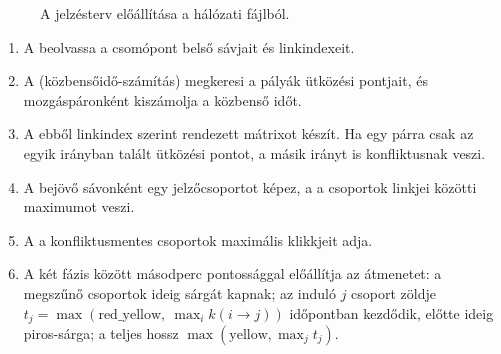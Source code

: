 \documentclass[11pt,a4paper]{article}
\begin{document}
\begin{figure}[h]
\centering
{}
\caption{A jelzésterv előállítása a hálózati fájlból.}
\label{fig:jelzesterv}
\end{figure}

\begin{enumerate}
  \item A  beolvassa a csomópont belső sávjait és linkindexeit.
  \item A  (közbensőidő-számítás) megkeresi a pályák ütközési pontjait,
        és mozgáspáronként kiszámolja a közbenső időt.
  \item A  ebből linkindex szerint rendezett mátrixot készít. Ha egy
        párra csak az egyik irányban talált ütközési pontot, a másik irányt is konfliktusnak veszi.
  \item A  bejövő sávonként egy jelzőcsoportot képez, a
         a csoportok linkjei közötti maximumot veszi.
  \item A  a konfliktusmentes csoportok maximális klikkjeit adja.
  \item A  két fázis között másodperc pontossággal előállítja az
        átmenetet: a megszűnő csoportok  ideig sárgát kapnak; az induló $j$ csoport zöldje
        $t_j = \max(\text{red\_yellow},\ \max_i k(i\to j))$ időpontban kezdődik, előtte
         ideig piros-sárga; a teljes hossz $\max(\text{yellow}, \max_j t_j)$.
\end{enumerate}
\end{document}
